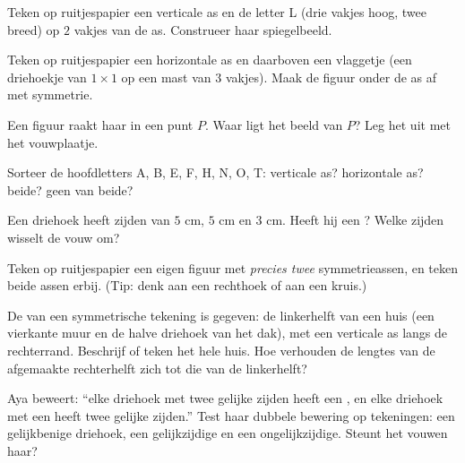 \begin{exercise}[$\star$]\label{exo:g4:symmetry:4}
Teken op ruitjespapier een verticale as en de letter L (drie vakjes hoog,
twee breed) op $2$ vakjes van de as. Construeer haar spiegelbeeld.
\end{exercise}

\begin{exercise}[$\star$]\label{exo:g4:symmetry:5}
Teken op ruitjespapier een horizontale as en daarboven een vlaggetje (een
driehoekje van $1 \times 1$ op een mast van $3$ vakjes). Maak de figuur
onder de as af met symmetrie.
\end{exercise}

\begin{exercise}[$\star$]\label{exo:g4:symmetry:6}
Een figuur raakt haar  in een punt $P$. Waar ligt het beeld van
$P$? Leg het uit met het vouwplaatje.
\end{exercise}

\begin{exercise}[$\star$]\label{exo:g4:symmetry:7}
Sorteer de hoofdletters A, B, E, F, H, N, O, T: verticale as? horizontale
as? beide? geen van beide?
\end{exercise}

\begin{exercise}[$\star$]\label{exo:g4:symmetry:8}
Een driehoek heeft zijden van $5$ cm, $5$ cm en $3$ cm. Heeft hij een
? Welke zijden wisselt de vouw om?
\end{exercise}

\begin{exercise}[$\star\star$]\label{exo:g4:symmetry:9}
Teken op ruitjespapier een eigen figuur met \emph{precies twee}
symmetrieassen, en teken beide assen erbij. (Tip: denk aan een rechthoek of
aan een kruis.)
\end{exercise}

\begin{exercise}[$\star\star$]\label{exo:g4:symmetry:10}
De  van een symmetrische tekening is gegeven: de linkerhelft van een
huis (een vierkante muur en de halve driehoek van het dak), met een
verticale as langs de rechterrand. Beschrijf of teken het hele huis. Hoe
verhouden de lengtes van de afgemaakte rechterhelft zich tot die van de
linkerhelft?
\end{exercise}

\begin{exercise}[$\star\star$]\label{exo:g4:symmetry:11}
Aya beweert: ``elke driehoek met twee gelijke zijden heeft een ,
en elke driehoek met een  heeft twee gelijke zijden.'' Test haar
dubbele bewering op tekeningen: een gelijkbenige driehoek, een gelijkzijdige
en een ongelijkzijdige. Steunt het vouwen haar?
\end{exercise}
